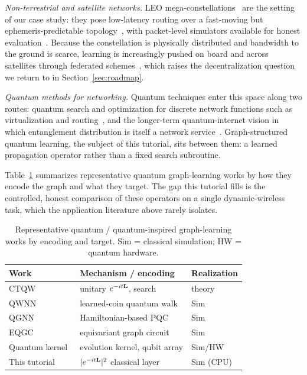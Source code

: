\emph{Non-terrestrial and satellite networks.} LEO
mega-constellations~\cite{delportillo2019technical} are the setting of our case study:
they pose low-latency routing over a fast-moving but ephemeris-predictable
topology~\cite{handley2018delay}, with packet-level simulators available for honest
evaluation~\cite{kassing2020hypatia}. Because the constellation is physically distributed
and bandwidth to the ground is scarce, learning is increasingly pushed on board and
across satellites through federated schemes~\cite{razmi2022board,matthiesen2024federated},
which raises the decentralization question we return to in Section~\ref{sec:roadmap}.

\emph{Quantum methods for networking.} Quantum techniques enter this space along two
routes: quantum search and optimization for discrete network functions such as
virtualization and routing~\cite{botsinis2019quantum}, and the longer-term
quantum-internet vision in which entanglement distribution is itself a network
service~\cite{wehner2018quantum}. Graph-structured quantum learning, the subject of this
tutorial, sits between them: a learned propagation operator rather than a fixed search
subroutine.

Table~\ref{tab:qgraphworks} summarizes representative quantum graph-learning works by how
they encode the graph and what they target. The gap this tutorial fills is the
controlled, honest comparison of these operators on a single dynamic-wireless task, which
the application literature above rarely isolates.

\begin{table}[t]
\centering
\caption{Representative quantum / quantum-inspired graph-learning works by encoding and
target. Sim = classical simulation; HW = quantum hardware.}
\label{tab:qgraphworks}
\renewcommand{\arraystretch}{1.25}
\footnotesize
\begin{tabular}{@{}p{}p{}p{}@{}}
\toprule
Work & Mechanism / encoding & Realization \\
\midrule
CTQW~\cite{childs2004quantumwalk} & unitary $e^{-it\mathbf{L}}$, search & theory \\
QWNN~\cite{dernbach2019qwnn} & learned-coin quantum walk & Sim \\
QGNN~\cite{verdon2019qgnn} & Hamiltonian-based PQC & Sim \\
EQGC~\cite{mernyei2022equivariant} & equivariant graph circuit & Sim \\
Quantum kernel~\cite{henry2021quantumkernel} & evolution kernel, qubit array & Sim/HW \\
This tutorial & $|e^{-it\mathbf{L}}|^2$ classical layer & Sim (CPU) \\
\bottomrule
\end{tabular}
\end{table}
